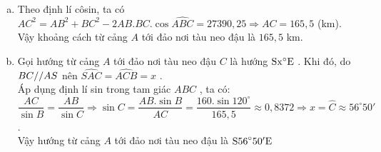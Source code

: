\begin{vd}
{\begin{enumerate}[a)]
			\item Theo định lí côsin, ta có\\
			$A{C^2}=A{B^2}+B{C^2}-2AB.BC.\cos\widehat{ABC}=27390,25\Rightarrow AC=165,5$ (km).\\
			Vậy khoảng cách từ cảng $A$ tới đảo nơi tàu neo đậu là $165,5$ km.
			\item Gọi hướng từ cảng $A$ tới đảo nơi tàu neo đậu $C$ là hướng $\rm{S}x^\circ{\rm{E}}$ . Khi đó, do $BC{\rm{//}}AS$ nên $\widehat{SAC}=\widehat{ACB}=x$ .\\
			Áp dụng định lí sin trong tam giác $ABC$ , ta có:\\
			$\dfrac{AC}{\sin B}=\dfrac{AB}{\sin C}\Rightarrow\sin C=\dfrac{AB.\sin B}{AC}=\dfrac{160.\sin 120^\circ}{165,5}\approx 0,8372\Rightarrow x=\widehat C\approx 56^\circ 50'$ .\\
			Vậy hướng từ cảng $A$ tới đảo nơi tàu neo đậu là $\rm{S56}^\circ 50'{\rm{E}}$
		\end{enumerate}
}
\end{vd}

